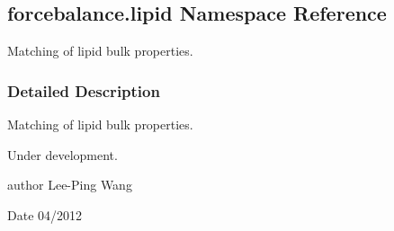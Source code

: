 \hypertarget{namespaceforcebalance_1_1lipid}{}\subsection{forcebalance.\+lipid Namespace Reference}
\label{namespaceforcebalance_1_1lipid}


Matching of lipid bulk properties.  




\subsubsection{Detailed Description}
Matching of lipid bulk properties. 

Under development.

author Lee-\/\+Ping Wang \begin{DoxyDate}{Date}
04/2012 
\end{DoxyDate}
